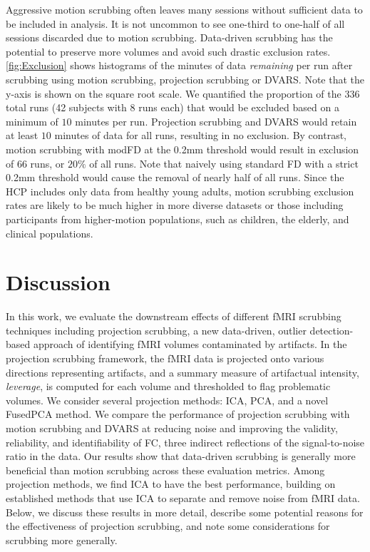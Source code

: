 \documentclass{article}
\begin{document}
Aggressive motion scrubbing often leaves many sessions without sufficient data to be included in analysis. It is not uncommon to see one-third to one-half of all sessions discarded due to motion scrubbing. Data-driven scrubbing has the potential to preserve more volumes and avoid such drastic exclusion rates. \autoref{fig:Exclusion} shows histograms of the minutes of data \textit{remaining} per run after scrubbing using motion scrubbing, projection scrubbing or DVARS. Note that the y-axis is shown on the square root scale. We quantified the proportion of the 336 total runs (42 subjects with 8 runs each) that would be excluded based on a minimum of $10$ minutes per run. Projection scrubbing and DVARS would retain at least $10$ minutes of data for all runs, resulting in no exclusion. By contrast, motion scrubbing with modFD at the 0.2mm threshold would result in exclusion of 66 runs, or $20\%$ of all runs. Note that naively using standard FD with a strict 0.2mm threshold would cause the removal of nearly half of all runs. Since the HCP includes only data from healthy young adults, motion scrubbing exclusion rates are likely to be much higher in more diverse datasets or those including participants from higher-motion populations, such as children, the elderly, and clinical populations.

\section{Discussion}
\label{sec:discussion}


In this work, we evaluate the downstream effects of different fMRI scrubbing techniques including projection scrubbing, a new data-driven, outlier detection-based approach of identifying fMRI volumes contaminated by artifacts. In the projection scrubbing framework, the fMRI data is projected onto various directions representing artifacts, and a summary measure of artifactual intensity, \textit{leverage}, is computed for each volume and thresholded to flag problematic volumes. We consider several projection methods: ICA, PCA, and a novel FusedPCA method. We compare the performance of projection scrubbing with motion scrubbing and DVARS at reducing noise and improving the validity, reliability, and identifiability of FC, three indirect reflections of the signal-to-noise ratio in the data. Our results show that data-driven  scrubbing is generally more beneficial than motion scrubbing across these evaluation metrics. Among projection methods, we find ICA to have the best performance, building on established methods that use ICA to separate and remove noise from fMRI data. Below, we discuss these results in more detail, describe some potential reasons for the effectiveness of projection scrubbing, and note some considerations for scrubbing more generally. 
\end{document}
